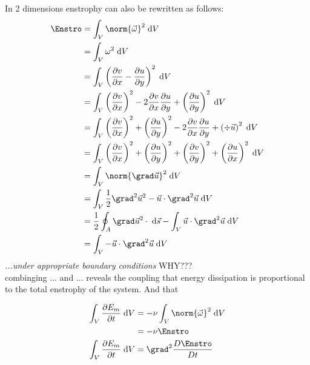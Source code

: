 In 2 dimensions enstrophy can also be rewritten as follows:
\begin{equation}\begin{split}
\Enstro
&=
\int_{V} \norm{\vec{\omega}}^{2}  \; \mathrm{d}V\\
&=
\int_{V} \omega^{2}  \; \mathrm{d}V\\
&=
\int_{V} \left( \frac{\partial v}{\partial x} - \frac{\partial u}{\partial y} \right)^2  \; \mathrm{d}V\\
&=
\int_{V} \left(\frac{\partial v}{\partial x}\right)^2
-2\frac{\partial v}{\partial x} \frac{\partial u}{\partial y}
+ \left(\frac{\partial u}{\partial y} \right)^2  \; \mathrm{d}V\\
&=
\int_{V} \left(\frac{\partial v}{\partial x}\right)^2
+ \left(\frac{\partial u}{\partial y} \right)^2
-2\frac{\partial v}{\partial x} \frac{\partial u}{\partial y}
+ \left( \div \vec{u} \right)^2
  \; \mathrm{d}V\\
&=
\int_{V} \left(\frac{\partial v}{\partial x}\right)^2
+ \left(\frac{\partial u}{\partial y} \right)^2
+\left(\frac{\partial v}{\partial y}\right)^2
+ \left(\frac{\partial u}{\partial x} \right)^2
  \; \mathrm{d}V\\
  &=
\int_{V}
\norm{\grad \vec{u}}^2
\; \mathrm{d}V\\
  &=
\int_{V}
\frac{1}{2} \grad^2 \vec{u}^2 -\vec{u} \cdot \grad^2 \vec{u}
\; \mathrm{d}V\\
  &=
\frac{1}{2}\oint_{A}   \grad \vec{u}^2 \cdot  \; \mathrm{d}\vec{s}
-\int_{V}\vec{u} \cdot \grad^2 \vec{u}  \; \mathrm{d}V\\
  &=
\int_{V}
-\vec{u} \cdot \grad^2 \vec{u}
\; \mathrm{d}V\\
\end{split}\end{equation}
\textit{...under appropriate boundary conditions} WHY???\\
combinging ... and ... reveals the coupling	that energy dissipation is proportional to the total enstrophy of the system.
And that


\begin{equation}\begin{split}
	\int_{V}\frac{\partial E_{m}}{\partial t} \; \mathrm{d}V
	&=
	-\nu \int_{V} \norm{\vec{\omega}}^{2}  \; \mathrm{d}V \\
	&=
	-\nu \Enstro\\
	\int_{V}\frac{\partial E_{m}}{\partial t} \; \mathrm{d}V
	&=
	\grad^{2} \frac{D \Enstro}{D t}
\end{split}\end{equation}



